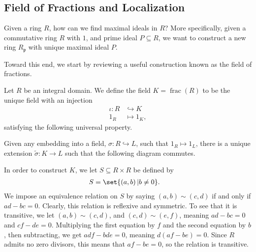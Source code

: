 \documentclass[10pt]{mypackage}
\begin{document}
\subsection{Field of Fractions and Localization}%
Given a ring $R$, how can we find maximal ideals in $R$? More specifically, given a commutative ring $R$ with $1$, and prime ideal $ P\subseteq R $, we want to construct a new ring $R_{\mathfrak{p}}$ with unique maximal ideal $P$.\newline

Toward this end, we start by reviewing a useful construction known as the field of fractions.
\begin{definition}
  Let $R$ be an integral domain. We define the field $K = \operatorname{frac}\left( R \right)$ to be the unique field with an injection
  \begin{align*}
    \iota\colon R&\hookrightarrow K\\
    1_{R} &\mapsto 1_{K},
  \end{align*}
  satisfying the following universal property.\newline

  Given any embedding into a field, $\sigma\colon R\hookrightarrow L$, such that $1_{R}\mapsto 1_{L}$, there is a unique extension $ \widetilde{\sigma}\colon K\rightarrow L $ such that the following diagram commutes.
  \begin{center}
  \end{center}
\end{definition}
In order to construct $K$, we let $S\subseteq R\times R$ be defined by
\begin{align*}
  S &= \set{\left( a,b \right) | b\neq 0}.
\end{align*}
We impose an equivalence relation on $S$ by saying $\left( a,b \right)\sim \left( c,d \right)$ if and only if $ ad - bc = 0 $. Clearly, this relation is reflexive and symmetric. To see that it is transitive, we let $\left( a,b \right)\sim \left( c,d \right)$, and $ \left( c,d \right)\sim \left( e,f \right) $, meaning $ad-bc=  0$ and $cf-de = 0$. Multiplying the first equation by $f$ and the second equation by $b$, then subtracting, we get $ adf - bde = 0 $, meaning $d\left( af-be  \right)= 0$. Since $R$ admits no zero divisors, this means that $ af-be = 0 $, so the relation is transitive.\newline
\end{document}
